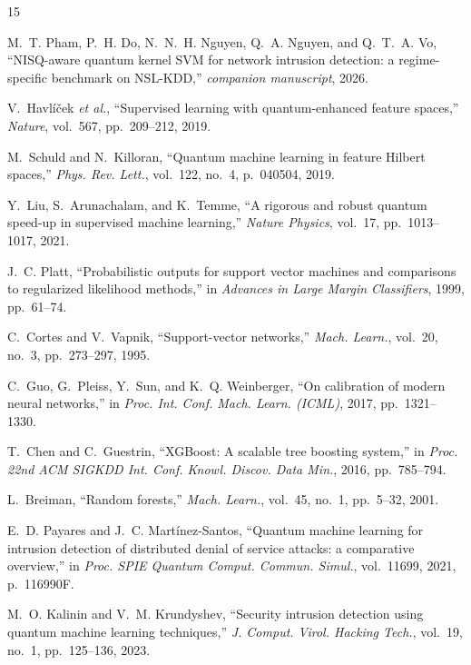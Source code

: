 \documentclass[runningheads]{llncs}
\newif\ifanonymous
\begin{document}
\begin{thebibliography}{15}

\ifanonymous
Author names and title omitted for double-blind review. Companion
  manuscript, under review, 2026.
\else
M.~T. Pham, P.~H. Do, N.~N.~H. Nguyen, Q.~A. Nguyen, and Q.~T.~A. Vo,
``NISQ-aware quantum kernel SVM for network intrusion detection: a
  regime-specific benchmark on NSL-KDD,'' \emph{companion manuscript},
  2026.
\fi

V.~Havl\'i\v{c}ek \emph{et al.},
``Supervised learning with quantum-enhanced feature spaces,''
\emph{Nature}, vol.~567, pp.~209--212, 2019.

M.~Schuld and N.~Killoran,
``Quantum machine learning in feature Hilbert spaces,''
\emph{Phys. Rev. Lett.}, vol.~122, no.~4, p.~040504, 2019.

Y.~Liu, S.~Arunachalam, and K.~Temme,
``A rigorous and robust quantum speed-up in supervised machine
  learning,'' \emph{Nature Physics}, vol.~17, pp.~1013--1017, 2021.

J.~C. Platt,
``Probabilistic outputs for support vector machines and comparisons
  to regularized likelihood methods,'' in
\emph{Advances in Large Margin Classifiers}, 1999, pp.~61--74.

C.~Cortes and V.~Vapnik, ``Support-vector networks,''
\emph{Mach. Learn.}, vol.~20, no.~3, pp.~273--297, 1995.

C.~Guo, G.~Pleiss, Y.~Sun, and K.~Q. Weinberger,
``On calibration of modern neural networks,'' in
\emph{Proc. Int. Conf. Mach. Learn. (ICML)}, 2017, pp.~1321--1330.

T.~Chen and C.~Guestrin,
``XGBoost: A scalable tree boosting system,'' in
\emph{Proc. 22nd ACM SIGKDD Int. Conf. Knowl. Discov. Data Min.},
2016, pp.~785--794.

L.~Breiman, ``Random forests,'' \emph{Mach. Learn.}, vol.~45, no.~1,
pp.~5--32, 2001.

E.~D. Payares and J.~C. Mart\'inez-Santos,
``Quantum machine learning for intrusion detection of distributed
  denial of service attacks: a comparative overview,'' in
\emph{Proc. SPIE Quantum Comput. Commun. Simul.}, vol.~11699, 2021,
p.~116990F.

M.~O. Kalinin and V.~M. Krundyshev,
``Security intrusion detection using quantum machine learning
  techniques,'' \emph{J. Comput. Virol. Hacking Tech.}, vol.~19,
no.~1, pp.~125--136, 2023.


\end{thebibliography}
\end{document}
